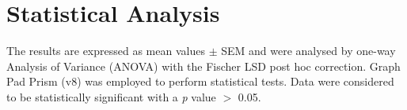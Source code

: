 \section{Statistical Analysis}
The results are expressed as mean values $\pm$ SEM and were analysed by one-way Analysis of Variance (ANOVA) with the Fischer LSD post hoc correction. Graph Pad Prism (v8) was employed to perform statistical tests. Data were considered to be statistically significant with a \textit{p} value $>$ 0.05.
 

